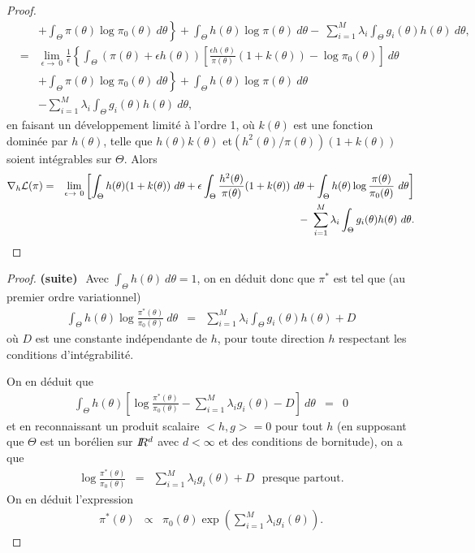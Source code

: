 \begin{proof}
\begin{eqnarray*}
& & \left. + \int_{\Theta} \pi(\theta) \log \pi_0(\theta) \ d\theta\right\}  
+ \int_{\Theta} h(\theta) \log\pi(\theta) \ d\theta  - \  \sum\limits_{i=1}^M \lambda_i \int_{\Theta} g_i(\theta) h(\theta) \ d\theta, \\
& = &  \lim\limits_{\epsilon\to\ 0} \frac{1}{\epsilon} \left\{ \int_{\Theta} \left(\pi(\theta) + \epsilon h(\theta)\right) \left[\frac{\epsilon h(\theta)}{\pi(\theta)}( 1+k(\theta)) -   \log \pi_0(\theta)\right]\ d\theta \right.\\
& & \left. + \int_{\Theta} \pi(\theta) \log \pi_0(\theta) \ d\theta\right\} 
+ \int_{\Theta} h(\theta) \log\pi(\theta) \ d\theta \\
& & -  \sum\limits_{i=1}^M \lambda_i \int_{\Theta} g_i(\theta) h(\theta) \ d\theta, 
\end{eqnarray*}
en faisant un développement limité à l'ordre 1, où $k(\theta)$ est une fonction dominée par $h(\theta)$, telle que $h(\theta)k(\theta)$ et$(h^2(\theta)/\pi(\theta))(1+k(\theta))$ soient intégrables sur $\Theta$. Alors 
\begin{eqnarray*}
\nabla_h {\cal{L}}({\pi}) & = &  \lim\limits_{\epsilon\to\ 0}  \left[\int_{\Theta} h(\theta)(1+k(\theta)) \ d\theta + \epsilon \int_{\Theta}\frac{h^2(\theta)}{\pi(\theta)}(1+k(\theta)) \ d\theta + \int_{\Theta} h(\theta) \log\frac{\pi(\theta)}{\pi_0(\theta)} \ d\theta\right] \\
&  & \ \ \ - \  \sum\limits_{i=1}^M \lambda_i \int_{\Theta} g_i(\theta) h(\theta) \ d\theta.
\end{eqnarray*}
\end{proof}

\begin{proof}{\bf (suite)} ${}^{}$ 
Avec $\int_{\Theta}h(\theta)\ d\theta = 1$, on en déduit donc que $\pi^*$ est tel que (au premier ordre variationnel)
\begin{eqnarray*}
\int_{\Theta} h(\theta) \log\frac{\pi^*(\theta)}{\pi_0(\theta)} \ d\theta & = &  \sum\limits_{i=1}^M \lambda_i \int_{\Theta} g_i(\theta) h(\theta) + D
\end{eqnarray*}
où $D$ est une constante indépendante de $h$, pour toute direction $h$ respectant les conditions d'intégrabilité. 

On en déduit que
\begin{eqnarray*}
\int_{\Theta} h(\theta) \left[ \log\frac{\pi^*(\theta)}{\pi_0(\theta)} -  \sum\limits_{i=1}^M \lambda_i  g_i(\theta) - D\right] \ d\theta & = &  0
\end{eqnarray*}
et en reconnaissant un produit scalaire $<h,g>=0$ pour tout $h$ (en supposant que $\Theta$ est un borélien sur $I\!\!R^d$ avec $d<\infty$ et des conditions de bornitude), on a  que 
\begin{eqnarray*}
\log\frac{\pi^*(\theta)}{\pi_0(\theta)}  & = &  \sum\limits_{i=1}^M \lambda_i g_i(\theta) + D \ \ \ \text{presque partout.}
\end{eqnarray*}
On en déduit l'expression
\begin{eqnarray*}
\pi^*(\theta)   & \propto & {\pi_0(\theta)} \exp\left( \sum\limits_{i=1}^M \lambda_i g_i(\theta)\right).
\end{eqnarray*}
\end{proof}